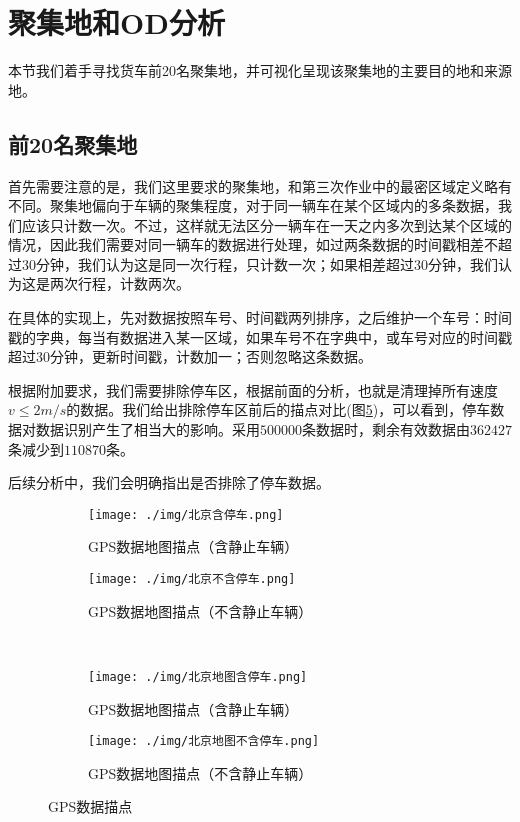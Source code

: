 \documentclass[UTF8]{ctexart}
\begin{document}
\section{聚集地和OD分析}

本节我们着手寻找货车前20名聚集地，并可视化呈现该聚集地的主要目的地和来源地。

\subsection{前20名聚集地}

首先需要注意的是，我们这里要求的聚集地，和第三次作业中的最密区域定义略有不同。聚集地偏向于车辆的聚集程度，对于同一辆车在某个区域内的多条数据，我们应该只计数一次。不过，这样就无法区分一辆车在一天之内多次到达某个区域的情况，因此我们需要对同一辆车的数据进行处理，如过两条数据的时间戳相差不超过$30$分钟，我们认为这是同一次行程，只计数一次；如果相差超过$30$分钟，我们认为这是两次行程，计数两次。

在具体的实现上，先对数据按照车号、时间戳两列排序，之后维护一个车号：时间戳的字典，每当有数据进入某一区域，如果车号不在字典中，或车号对应的时间戳超过$30$分钟，更新时间戳，计数加一；否则忽略这条数据。

根据附加要求，我们需要排除停车区，根据前面的分析，也就是清理掉所有速度$v\le 2 m /s$的数据。我们给出排除停车区前后的描点对比(图\ref{beijingGPS})，可以看到，停车数据对数据识别产生了相当大的影响。采用$500000$条数据时，剩余有效数据由$362427$条减少到$110870$条。

后续分析中，我们会明确指出是否排除了停车数据。

\begin{figure}[!htb]
    \centering
    \begin{subfigure}[b]{0.49\textwidth}
        \texttt{[image: ./img/北京含停车.png]}
        \caption{GPS数据地图描点（含静止车辆）}
        \label{beijing}
    \end{subfigure}
    \hfill
    \begin{subfigure}[b]{0.49\textwidth}
        \texttt{[image: ./img/北京不含停车.png]}
        \caption{GPS数据地图描点（不含静止车辆）}
        \label{beijingstop}
    \end{subfigure}
    \\
    \begin{subfigure}[b]{0.49\textwidth}
        \texttt{[image: ./img/北京地图含停车.png]}
        \caption{GPS数据地图描点（含静止车辆）}
        \label{beijingmap}
    \end{subfigure}
    \hfill
    \begin{subfigure}[b]{0.49\textwidth}
        \texttt{[image: ./img/北京地图不含停车.png]}
        \caption{GPS数据地图描点（不含静止车辆）}
        \label{beijingmapstop}
    \end{subfigure}
    \caption{GPS数据描点}
    \label{beijingGPS}
\end{figure}
\end{document}
